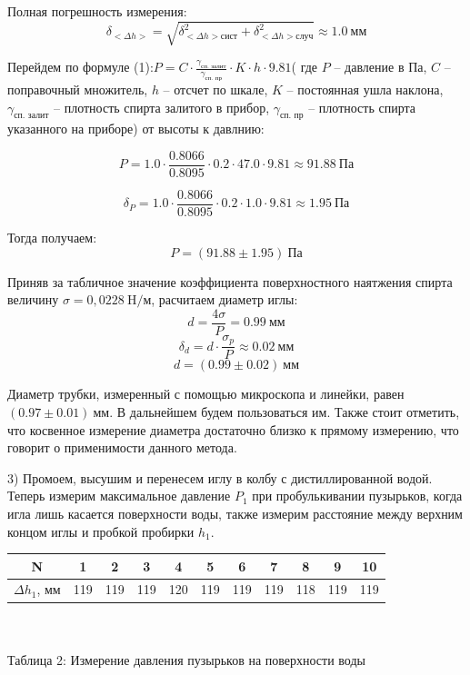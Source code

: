 \documentclass[a4paper,12pt]{article} %
\begin{document}
Полная погрешность измерения:
\[\delta_{<\Delta h>} = \sqrt{\delta_{<\Delta h> \text{сист}}^2 + 
							  \delta_{<\Delta h> \text{случ}}^2} \approx 1.0\ \text{мм}\]
							  
Перейдем по формуле (1):$\displaystyle P = C\cdot \frac{\gamma_\text{сп. залит}}{\gamma_\text{сп. пр}}\cdot K\cdot h\cdot 9.81$( где $P$ -- давление в Па, $C$ -- поправочный множитель, $h$ -- отсчет по шкале, $K$ -- постоянная ушла наклона, $\gamma_\text{сп. залит}$ -- плотность спирта залитого в прибор, $\gamma_\text{сп. пр}$ -- плотность спирта указанного на приборе) от высоты к давлнию:

\[P = 1.0\cdot \frac{0.8066}{0.8095}\cdot 0.2\cdot 47.0\cdot 9.81\approx 91.88\ \text{Па}\]

\[\delta_P = 1.0\cdot \frac{0.8066}{0.8095}\cdot 0.2\cdot 1.0\cdot 9.81\approx 1.95\ \text{Па}\]

Тогда получаем:
\[P = (91.88 \pm 1.95)\ \text{Па}\]

Приняв за табличное значение коэффициента поверхностного наятжения спирта величину $\sigma = 0,0228\ \text{H/м}$, расчитаем диаметр иглы:
\[d = \frac{4\sigma}{P} = 0.99\ \text{мм}\]
\[\delta_d = d\cdot \frac{\sigma_p}{P} \approx 0.02\ \text{мм}\]
\[d = (0.99 \pm 0.02)\ \text{мм}\]

Диаметр трубки, измеренный с помощью микроскопа и линейки, равен $(0.97 \pm 0.01)\ \text{мм}$. В дальнейшем будем пользоваться им. Также стоит отметить, что косвенное измерение диаметра достаточно близко к прямому измерению, что говорит о применимости данного метода.

\setlength{\parskip}{0.5cm}

3) Промоем, высушим и перенесем иглу в колбу с дистиллированной водой. Теперь измерим максимальное давление $P_1$ при пробулькивании пузырьков, когда игла лишь касается поверхности воды, также измерим расстояние между верхним концом иглы и пробкой пробирки $h_1$.

\begin{tabular}{ | c | c | c | c | c | c |c | c | c | c | c | }
\hline
	N  & 1  & 2  & 3  & 4  & 5  & 6  & 7  & 8  & 9  & 10 \\ \hline
	$\Delta h_1$, мм & 119 & 119 & 119 & 120 & 119 & 119 & 119 & 118 & 119 & 119 \\ \hline
\end{tabular}\\
\setlength{\parskip}{0.3cm}\\
Таблица 2: Измерение давления пузырьков на поверхности воды
\end{document}
